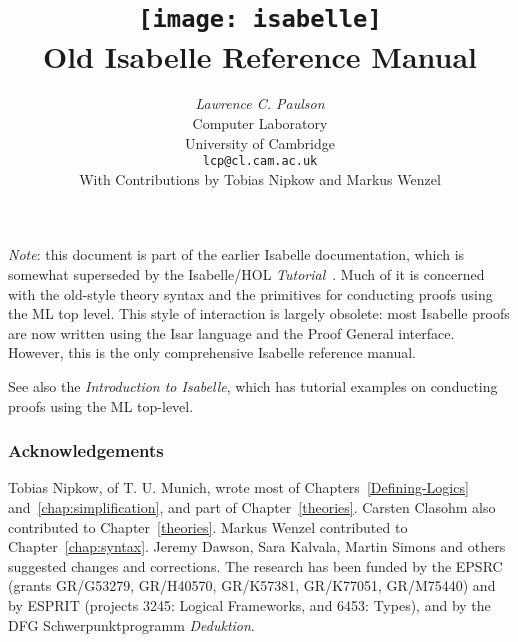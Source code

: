 \documentclass[12pt,a4paper]{report}
\title{\texttt{[image: isabelle]} \\[4ex] Old Isabelle Reference Manual}
\author{{\em Lawrence C. Paulson}\\
        Computer Laboratory \\ University of Cambridge \\
        \texttt{lcp@cl.cam.ac.uk}\\[3ex] 
        With Contributions by Tobias Nipkow and Markus Wenzel}
\begin{document}
\underscoreoff


\maketitle 
\emph{Note}: this document is part of the earlier Isabelle documentation, 
which is somewhat superseded by the Isabelle/HOL
\emph{Tutorial}~\cite{isa-tutorial}. Much of it is concerned with 
the old-style theory syntax and the primitives for conducting proofs 
using the ML top level. This style of interaction is largely obsolete:
most Isabelle proofs are now written using the Isar 
language and the Proof General interface. However, this is the only
comprehensive Isabelle reference manual.  

See also the \emph{Introduction to Isabelle}, which has tutorial examples
on conducting proofs using the ML top-level.

\subsubsection*{Acknowledgements} 
Tobias Nipkow, of T. U. Munich, wrote most of
  Chapters~\protect\ref{Defining-Logics} and~\protect\ref{chap:simplification},
  and part of
  Chapter~\protect\ref{theories}.  Carsten Clasohm also contributed to
  Chapter~\protect\ref{theories}.  Markus Wenzel contributed to
  Chapter~\protect\ref{chap:syntax}.  Jeremy Dawson, Sara Kalvala, Martin
  Simons  and others suggested changes
  and corrections.  The research has been funded by the EPSRC (grants
  GR/G53279, GR/H40570, GR/K57381, GR/K77051, GR/M75440) and by ESPRIT
  (projects 3245: Logical Frameworks, and 6453: Types), and by the DFG
  Schwerpunktprogramm \emph{Deduktion}.

 \tableofcontents \clearfirst














\begingroup
   \small\raggedright\frenchspacing
  
\endgroup


\printindex
\end{document}
